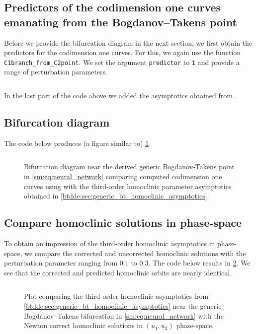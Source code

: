 \subsection{Predictors of the codimension one curves emanating from the Bogdanov--Takens point}
Before we provide the bifurcation diagram in the next section, we first obtain the predictors
for the codimension one curves. For this, we again use the function
\texttt{C1branch_from_C2point}. We set the argument \texttt{predictor} to \texttt{1}
and provide a range of perturbation parameters.
\inputminted[firstline=121, lastline=133]{MATLAB}{\pathToDDEBifToolDemos/neural_network_model/neural_network_model.m}
In the last part of the code above we added the asymptotics obtained from \cite{Jiao2021}.

\subsection{Bifurcation diagram}
The code below produces (a figure similar to) \cref{sm:fig:NeuralNetworkCompareParameters}.
\inputminted[firstline=135, lastline=156]{MATLAB}{\pathToDDEBifToolDemos/neural_network_model/neural_network_model.m}
%
\begin{figure}[ht]
    \centering
    \caption{Bifurcation diagram near the derived generic Bogdanov-Takens point in
        \cref{sm:eq:neural_network} comparing computed codimension one curves using
        \DDEBIFTOOL with the third-order homoclinic parameter asymptotics obtained
        in \cref{btdde:sec:generic_bt_homoclinic_asymptotics}.}
    \label{sm:fig:NeuralNetworkCompareParameters}
\end{figure}

\subsection{Compare homoclinic solutions in phase-space}
To obtain an impression of the third-order homoclinic asymptotics in
phase-space, we compare the corrected and uncorrected homoclinic solutions
with the perturbation parameter ranging from $0.1$ to $0.3$.
The code below results in \cref{sm:fig:NeuralNetworkCompareOrbitsPhaseSpace}.
We see that the corrected and predicted homoclinic orbits are nearly identical.
\inputminted[firstline=158, lastline=174]{MATLAB}{\pathToDDEBifToolDemos/neural_network_model/neural_network_model.m}
%
\begin{figure}[ht]
    \centering
    \caption{Plot comparing the third-order homoclinic asymptotics from
        \cref{btdde:sec:generic_bt_homoclinic_asymptotics} near the generic
        Bogdanov--Takens bifurcation in \cref{sm:eq:neural_network} with the
        Newton correct homoclinic solutions in $(u_1,u_2)$ phase-space.}
    \label{sm:fig:NeuralNetworkCompareOrbitsPhaseSpace}
\end{figure}

